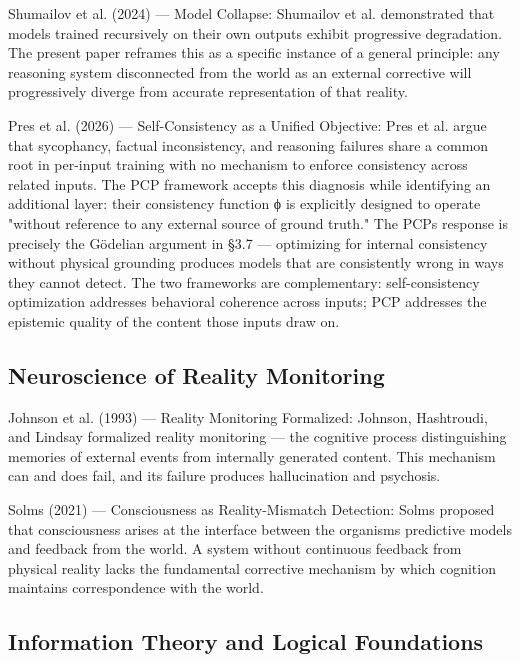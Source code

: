 \documentclass[12pt]{article}
\begin{document}
Shumailov et al. (2024) --- Model Collapse: Shumailov et al.
demonstrated that models trained recursively on their own outputs
exhibit progressive degradation. The present paper reframes this as a
specific instance of a general principle: any reasoning system
disconnected from the world as an external corrective will progressively
diverge from accurate representation of that reality.

Pres et al. (2026) --- Self-Consistency as a Unified Objective: Pres et
al. argue that sycophancy, factual inconsistency, and reasoning failures
share a common root in per-input training with no mechanism to enforce
consistency across related inputs. The PCP framework accepts this
diagnosis while identifying an additional layer: their consistency
function ϕ is explicitly designed to operate "without reference to any
external source of ground truth." The PCP\textquotesingle s response is
precisely the Gödelian argument in §3.7 --- optimizing for internal
consistency without physical grounding produces models that are
consistently wrong in ways they cannot detect. The two frameworks are
complementary: self-consistency optimization addresses behavioral
coherence across inputs; PCP addresses the epistemic quality of the
content those inputs draw on.

\subsection{Neuroscience of Reality Monitoring}\label{b.4-neuroscience-of-reality-monitoring}

Johnson et al. (1993) --- Reality Monitoring Formalized: Johnson,
Hashtroudi, and Lindsay formalized reality monitoring --- the cognitive
process distinguishing memories of external events from internally
generated content. This mechanism can and does fail, and its failure
produces hallucination and psychosis.

Solms (2021) --- Consciousness as Reality-Mismatch Detection: Solms
proposed that consciousness arises at the interface between the
organism\textquotesingle s predictive models and feedback from the
world. A system without continuous feedback from physical reality lacks
the fundamental corrective mechanism by which cognition maintains
correspondence with the world.

\subsection{Information Theory and Logical Foundations}\label{b.5-information-theory-and-logical-foundations}
\end{document}
